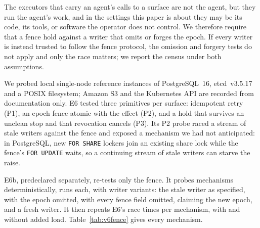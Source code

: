  The executors that carry an agent's calls to a surface are not the agent, but they run
the agent's work, and in the settings this paper is about they may be its code, its tools, or software the operator
does not control. We therefore require that a fence hold against a writer that omits or forges the epoch. If every
writer is instead trusted to follow the fence protocol, the omission and forgery tests do not apply and only the race
matters; we report the census under both assumptions.

 We probed local single-node reference instances of PostgreSQL~16, etcd~v3.5.17 and a POSIX
filesystem; Amazon S3 and the Kubernetes API are recorded from documentation only. E6 tested three primitives per
surface: idempotent retry (P1), an epoch fence atomic with the effect (P2), and a hold that survives an unclean stop and
that revocation cancels (P3). \vsixESixPOneThreeSentence{} Its P2 probe raced a stream of stale writers against the
fence and exposed a mechanism we had not anticipated: in PostgreSQL, new \texttt{FOR SHARE} lockers join an existing
share lock while the fence's \texttt{FOR UPDATE} waits, so a continuing stream of stale writers can starve the raise.

E6b, predeclared separately, re-tests only the fence. It probes
\vsixESixBMechanisms{} mechanisms deterministically, \vsixESixBRuns{} runs each, with \vsixESixBVariants{} writer
variants: the stale writer as specified, with the epoch
omitted, with every fence field omitted, claiming the new epoch, and a fresh writer. It then repeats E6's race
\vsixESixBStarvationN{} times per mechanism, with and without added load. \vsixESixBSentence{} Table~\ref{tab:v6fence}
gives every mechanism.




